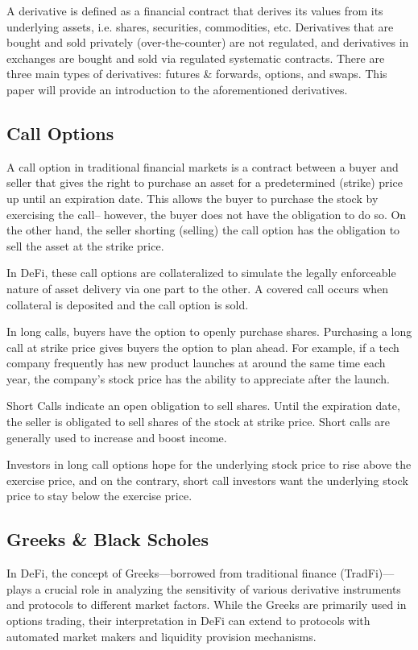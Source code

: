 \documentclass[12pt]{article}
\begin{document}
A derivative is defined as a financial contract that derives its values from its underlying assets, i.e. shares, securities, commodities, etc. Derivatives that are bought and sold privately (over-the-counter) are not regulated, and derivatives in exchanges are bought and sold via regulated systematic contracts.
There are three main types of derivatives: futures \& forwards, options, and swaps. This paper will provide an introduction to the aforementioned derivatives.
\subsection{Call Options}
A call option in traditional financial markets is a contract between a buyer and seller that gives the right to purchase an asset for a predetermined (strike) price up until an expiration date. This allows the buyer to purchase the stock by exercising the call– however, the buyer does not have the obligation to do so. On the other hand, the seller shorting (selling) the call option has the obligation to sell the asset at the strike price. 

In DeFi, these call options are collateralized to simulate the legally enforceable nature of asset delivery via one part to the other. A covered call occurs when collateral is deposited and the call option is sold. 

In long calls, buyers have the option to openly purchase shares. Purchasing a long call at strike price gives buyers the option to plan ahead. For example, if a tech company frequently has new product launches at around the same time each year, the company’s stock price has the ability to appreciate after the launch. 

Short Calls indicate an open obligation to sell shares. Until the expiration date, the seller is obligated to sell shares of the stock at strike price. Short calls are generally used to increase and boost income. 

Investors in long call options hope for the underlying stock price to rise above the exercise price, and on the contrary, short call investors want the underlying stock price to stay below the exercise price. 

\subsection{Greeks \& Black Scholes}\label{subsec:greeks}
In DeFi, the concept of Greeks—borrowed from traditional finance (TradFi)—plays a crucial role in analyzing the sensitivity of various derivative instruments and protocols to different market factors. While the Greeks are primarily used in options trading, their interpretation in DeFi can extend to protocols with automated market makers and liquidity provision mechanisms.
\end{document}
